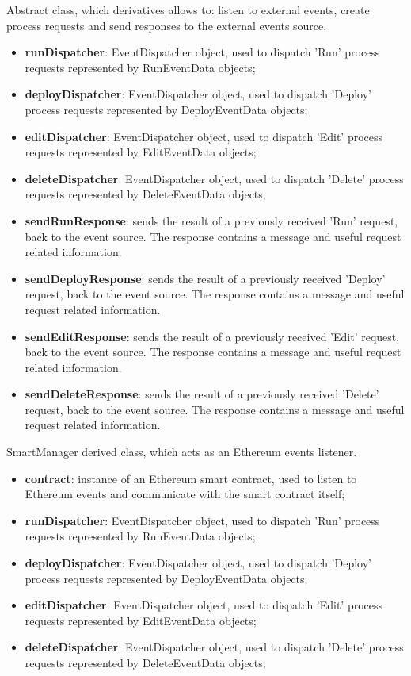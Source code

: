 	Abstract class, which derivatives allows to: listen to external events, create process requests and send responses to the external events source.
	\begin{itemize}
		\item \textbf{runDispatcher}: EventDispatcher object, used to dispatch 'Run' process requests represented by RunEventData objects;
		\item \textbf{deployDispatcher}: EventDispatcher object, used to dispatch 'Deploy' process requests represented by DeployEventData objects;
		\item \textbf{editDispatcher}: EventDispatcher object, used to dispatch 'Edit' process requests represented by EditEventData objects;
		\item \textbf{deleteDispatcher}: EventDispatcher object, used to dispatch 'Delete' process requests represented by DeleteEventData objects;
	\end{itemize}
	\begin{itemize}
		\item \textbf{sendRunResponse}: sends the result of a previously received 'Run' request, back to the event source. The response contains a message and useful request related information.
		\item \textbf{sendDeployResponse}: sends the result of a previously received 'Deploy' request, back to the event source. The response contains a message and useful request related information.
		\item \textbf{sendEditResponse}: sends the result of a previously received 'Edit' request, back to the event source. The response contains a message and useful request related information.
		\item \textbf{sendDeleteResponse}: sends the result of a previously received 'Delete' request, back to the event source. The response contains a message and useful request related information.
	\end{itemize}
	SmartManager derived class, which acts as an Ethereum events listener.
	\begin{itemize}
		\item \textbf{contract}: instance of an Ethereum smart contract, used to listen to Ethereum events and communicate with the smart contract itself;
		\item \textbf{runDispatcher}: EventDispatcher object, used to dispatch 'Run' process requests represented by RunEventData objects;
		\item \textbf{deployDispatcher}: EventDispatcher object, used to dispatch 'Deploy' process requests represented by DeployEventData objects;
		\item \textbf{editDispatcher}: EventDispatcher object, used to dispatch 'Edit' process requests represented by EditEventData objects;
		\item \textbf{deleteDispatcher}: EventDispatcher object, used to dispatch 'Delete' process requests represented by DeleteEventData objects;
	\end{itemize}
